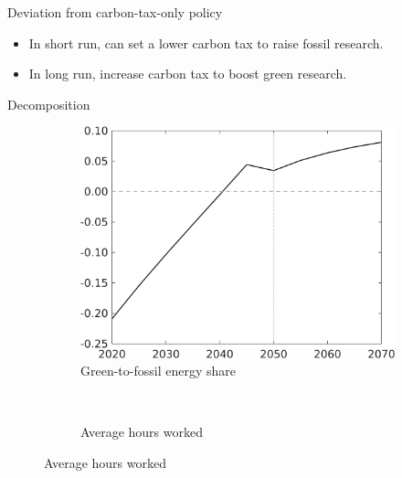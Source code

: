 \documentclass[11pt,aspectratio=169]{beamer}
\begin{document}
\begin{frame}{Deviation from carbon-tax-only policy}
\begin{figure}
\begin{subfigure}{0.4\textwidth}
	\end{subfigure}
\end{figure}
\vspace{3mm}
\pause
\begin{block}{}
	\begin{itemize}
		\item<+-> In short run, can set a lower carbon tax to raise fossil research.
		\item<+-> In long run, increase carbon tax to boost green research.
	\end{itemize}
\end{block}	
\end{frame}

\begin{frame}{Decomposition}
\pause
\centering

\begin{figure}[h!!]
	\centering
	\begin{subfigure}{0.4\textwidth}		
		\caption{\normalsize{Green-to-fossil energy share}}
		\includegraphics[width=1\textwidth]{../codding_model/own_basedOnFried/optimalPol_010922_revision/figures/all_13Sept22_Tplus30/CountTAUF_CTOPer_Opt_target_GFF_nsk0_xgr0_knspil0_regime4_spillover0_sep0_extern0_PV1_etaa0.79.png}
	\end{subfigure}
	\begin{minipage}[]{0.1\textwidth}
		\
	\end{minipage}
	\begin{subfigure}{0.4\textwidth}		
		\caption{\normalsize{Average hours worked} }

\end{subfigure}
\end{figure}
\end{frame}
\end{document}
